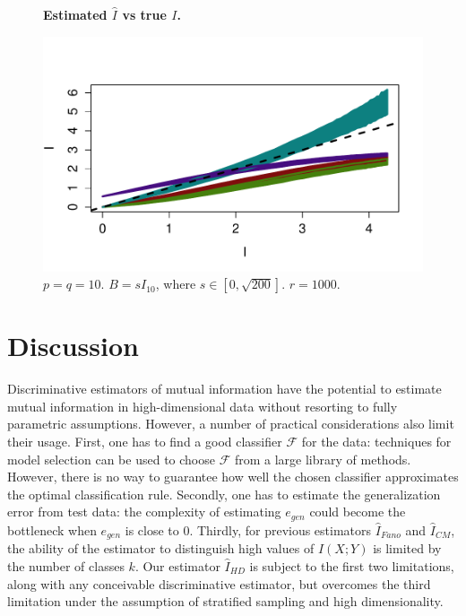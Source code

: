\documentclass{article}
\begin{document}
\begin{figure}
\begin{center}
\textbf{Estimated $\hat{I}$ vs true $I$.} 

\includegraphics[scale = 0.5, clip=true, trim=0.4in 0.5in 0 0.5in]{../info_theory_sims/fig4.pdf}
\end{center}
\caption{$p = q = 10$. $B = sI_{10}$, where $s \in [0, \sqrt{200}]$.  $r = 1000$.}
\end{figure}

\section{Discussion}

Discriminative estimators of mutual information have the potential to estimate
mutual information in high-dimensional data without resorting to fully parametric assumptions.
However, a number of practical considerations also limit their usage.
First, one has to find a good classifier $\mathcal{F}$ for the data:
techniques for model selection can be used to choose $\mathcal{F}$
from a large library of methods.  However, there is no way to guarantee how well
the chosen classifier approximates the optimal classification rule.
Secondly, one has to estimate the generalization error from test data:
the complexity of estimating $e_{gen}$ could become the bottleneck when $e_{gen}$ is close to 0.
Thirdly, for previous estimators $\hat{I}_{Fano}$ and $\hat{I}_{CM}$,
the ability of the estimator to distinguish high values of $I(X; Y)$ is limited by the number of classes $k$.
Our estimator $\hat{I}_{HD}$ is subject to the first two limitations, along with
any conceivable discriminative estimator, but overcomes the third limitation
under the assumption of stratified sampling and high dimensionality.
\end{document}
